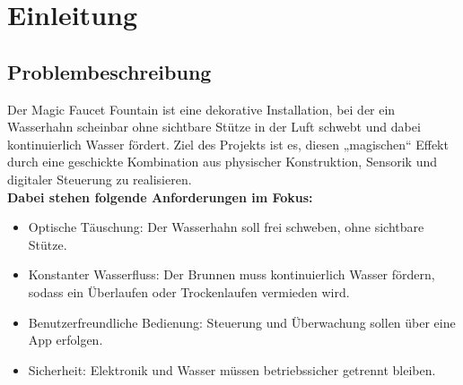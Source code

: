 %
%
%

\chapter{Einleitung}
\label{chap:einleitungDoku}
\section{Problembeschreibung}
Der Magic Faucet Fountain ist eine dekorative Installation, bei der ein Wasserhahn scheinbar ohne sichtbare Stütze in der Luft schwebt und dabei kontinuierlich Wasser fördert. Ziel des Projekts ist es, diesen „magischen“ Effekt durch eine geschickte Kombination aus physischer Konstruktion, Sensorik und digitaler Steuerung zu realisieren.\\

\textbf{Dabei stehen folgende Anforderungen im Fokus:}
\begin{itemize}
	\item Optische Täuschung: Der Wasserhahn soll frei schweben, ohne sichtbare Stütze.
	\item Konstanter Wasserfluss: Der Brunnen muss kontinuierlich Wasser fördern, sodass ein Überlaufen oder Trockenlaufen vermieden wird.
	\item Benutzerfreundliche Bedienung: Steuerung und Überwachung sollen über eine App erfolgen.
	\item Sicherheit: Elektronik und Wasser müssen betriebssicher getrennt bleiben.
\end{itemize}

